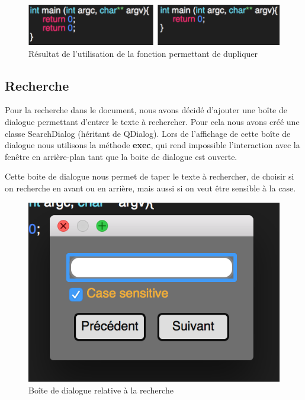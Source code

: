 \documentclass[a4paper,12pt]{article}
\begin{document}
	\begin{figure}[h!]
		\begin{center}
			\includegraphics[scale=0.8]{images/imgs_edit/resultat_duplication}
			\caption{Résultat de l'utilisation de la fonction permettant de dupliquer}
		\end{center}
	\end{figure}

	\newpage
	\subsection{Recherche}

	Pour la recherche dans le document, nous avons décidé d'ajouter une boîte de dialogue permettant d'entrer le texte à rechercher. Pour cela nous avons créé une classe SearchDialog (héritant de QDialog). Lors de l'affichage de cette boîte de dialogue nous utilisons la méthode \textbf{exec}, qui rend impossible l'interaction avec la fenêtre en arrière-plan tant que la boite de dialogue est ouverte.

	Cette boite de dialogue nous permet de taper le texte à rechercher, de choisir si on recherche en avant ou en arrière, mais aussi si on veut être sensible à la case.

	\begin{figure}[h!]
		\begin{center}
			\includegraphics[scale=0.8]{images/imgs_edit/boite_dialog_recherche}
			\caption{Boîte de dialogue relative à la recherche}
		\end{center}
	\end{figure}
\end{document}
